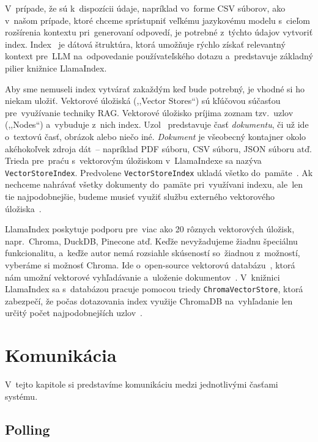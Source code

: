V~prípade, že sú k~dispozícii údaje, napríklad vo~forme CSV súborov, ako v~našom prípade, ktoré chceme sprístupniť veľkému jazykovému modelu s~cieľom rozšírenia kontextu pri~generovaní odpovedí, je potrebné z~týchto údajov vytvoriť index. Index~\cite{index} je dátová štruktúra, ktorá umožňuje rýchlo získať relevantný kontext pre~LLM na~odpovedanie používateľského dotazu a~predstavuje základný pilier knižnice LlamaIndex.

Aby sme nemuseli index vytvárať zakaždým keď bude potrebný, je vhodné si ho niekam uložiť. Vektorové úložiská (,,Vector Stores``) sú kľúčovou súčasťou pre~využívanie techniky RAG. Vektorové úložisko príjima zoznam tzv.~uzlov (,,Nodes``) a~vybuduje z~nich index. Uzol~\cite{documents-and-nodes} predstavuje časť \textit{dokumentu}, či už ide o~textovú časť, obrázok alebo niečo iné. \textit{Dokument} je všeobecný kontajner okolo akéhokoľvek zdroja dát~-- napríklad PDF súboru, CSV súboru, JSON súboru atď. Trieda pre~praću s~vektorovým úložiskom v~LlamaIndexe sa nazýva \texttt{VectorStoreIndex}. Predvolene \texttt{VectorStoreIndex} ukladá všetko do~pamäte~\cite{vector-store-index}. Ak nechceme nahrávať všetky dokumenty do~pamäte pri~využívani indexu, ale~len tie najpodobnejšie, budeme musieť využiť službu externého vektorového úložiska~\cite{external-vector-store-service}.

LlamaIndex poskytuje podporu pre~viac ako 20 rôznych vektorových úložisk, napr.~Chroma, DuckDB, Pinecone atď. Keďže nevyžadujeme žiadnu špeciálnu funkcionalitu, a~keďže autor nemá rozsiahle skúseností so~žiadnou z~možností, vyberáme si možnosť Chroma. Ide o~open-source vektorovú databázu~\cite{chroma2}, ktorá nám umožní vektorové vyhľadávanie a~uloženie dokumentov~\cite{chroma}. V~knižnici LlamaIndex sa s~databázou pracuje pomocou triedy \texttt{ChromaVectorStore}, ktorá zabezpečí, že počas dotazovania index využije ChromaDB na~vyhľadanie len určitý počet najpodobnejších uzlov~\cite{chroma-vector-store}.

\section{Komunikácia}

V~tejto kapitole si predstavíme komunikáciu medzi jednotlivými časťami systému.

\subsection{Polling}

